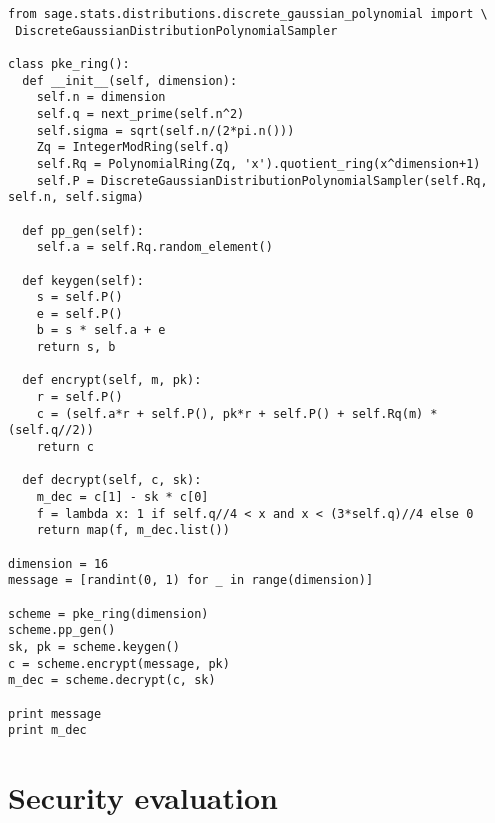 \documentclass[10pt,a4paper,nobib]{tufte-handout}
\begin{document}
\lstset{language=sage,label= ,caption= ,captionpos=b,numbers=none}
\begin{lstlisting}
from sage.stats.distributions.discrete_gaussian_polynomial import \
 DiscreteGaussianDistributionPolynomialSampler

class pke_ring():
  def __init__(self, dimension):
    self.n = dimension
    self.q = next_prime(self.n^2)
    self.sigma = sqrt(self.n/(2*pi.n()))
    Zq = IntegerModRing(self.q)
    self.Rq = PolynomialRing(Zq, 'x').quotient_ring(x^dimension+1)
    self.P = DiscreteGaussianDistributionPolynomialSampler(self.Rq, self.n, self.sigma)

  def pp_gen(self):
    self.a = self.Rq.random_element()

  def keygen(self):
    s = self.P()
    e = self.P()
    b = s * self.a + e
    return s, b

  def encrypt(self, m, pk):
    r = self.P()
    c = (self.a*r + self.P(), pk*r + self.P() + self.Rq(m) * (self.q//2))
    return c

  def decrypt(self, c, sk):
    m_dec = c[1] - sk * c[0]
    f = lambda x: 1 if self.q//4 < x and x < (3*self.q)//4 else 0
    return map(f, m_dec.list())

dimension = 16
message = [randint(0, 1) for _ in range(dimension)]

scheme = pke_ring(dimension)
scheme.pp_gen()
sk, pk = scheme.keygen()
c = scheme.encrypt(message, pk)
m_dec = scheme.decrypt(c, sk)

print message
print m_dec
\end{lstlisting}

\section{Security evaluation}
\end{document}
